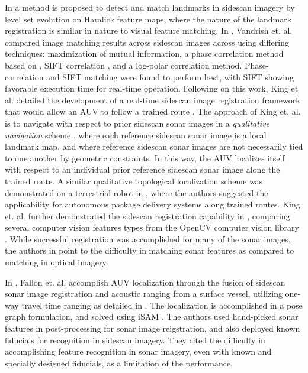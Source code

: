 In \cite{Stalder2008} a method is proposed to detect and match landmarks in sidescan imagery by level set evolution on Haralick feature maps, where the nature of the landmark registration is similar in nature to visual feature matching. 
In \cite{Vandrish2011}, Vandrish et. al. compared image matching results across sidescan images across using differing techniques: maximization of mutual information, a phase correlation method based on \cite{Reddy1996}, SIFT correlation \cite{Lowe2004}, and a log-polar correlation method.
Phase-correlation and SIFT matching were found to perform best, with SIFT showing favorable execution time for real-time operation.
Following on this work, King et al. detailed the development of a real-time sidescan image registration framework that would allow an AUV to follow a trained route \cite{King2012}.
The approach of King et. al. is to navigate with respect to prior sidescan sonar images in a \emph{qualitative navigation} scheme \cite{Levitt1990}, where each reference sidescan sonar image is a local landmark map, and where reference sidescan sonar images are not necessarily tied to one another by geometric constraints.
In this way, the AUV localizes itself with respect to an individual prior reference sidescan sonar image along the trained route.
A similar qualitative topological localization scheme was demonstrated on a terrestrial robot in \cite{Zhang2009}, where the authors suggested the applicability for autonomous package delivery systems along trained routes.
King et. al. further demonstrated the sidescan registration capability in \cite{King2013}, comparing several computer vision features types from the OpenCV computer vision library \cite{opencv_library}.
While successful registration was accomplished for many of the sonar images, the authors in \cite{King2013} point to the difficulty in matching sonar features as compared to matching in optical imagery.

In \cite{Fallon2011}, Fallon et. al. accomplish AUV localization through the fusion of sidescan sonar image registration and acoustic ranging from a surface vessel, utilizing one-way travel time ranging as detailed in \cite{Eustice2007}.
The localization is accomplished in a pose graph formulation, and solved using iSAM \cite{Dellaert2006}.
The authors used hand-picked sonar features in post-processing for sonar image reigstration, and also deployed known fiducials for recognition in sidescan imagery.
They cited the difficulty in accomplishing feature recognition in sonar imagery, even with known and specially designed fiducials, as a limitation of the performance.

